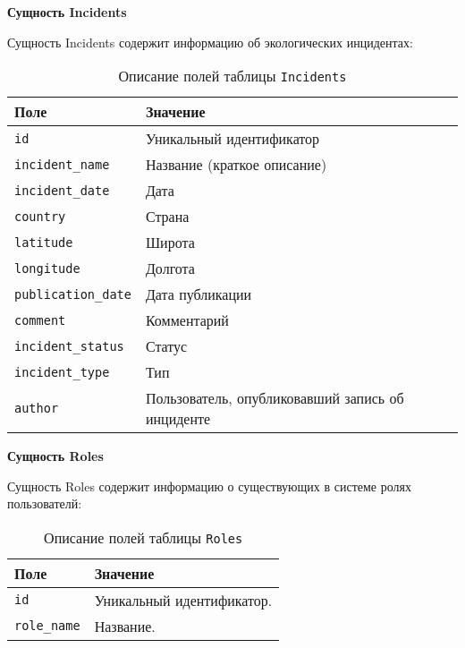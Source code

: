 \noindent\textbf{Сущность Incidents}

Сущность Incidents содержит информацию об экологических инцидентах:
\begin{table}[!ht]
    \caption{Описание полей таблицы \texttt{Incidents}}
    \label{tbl:incidents}
    \begin{center}
        \begin{tabular}{|p{}p{}|}
            \hline
            \textbf{Поле} & \textbf{Значение} \\\hline
            \texttt{id} & Уникальный идентификатор \\\hline
            \texttt{incident\_name} & Название (краткое описание) \\\hline
            \texttt{incident\_date} & Дата\\\hline
            \texttt{country} & Страна \\\hline
            \texttt{latitude} & Широта \\\hline
            \texttt{longitude} & Долгота \\\hline
            \texttt{publication\_date} & Дата публикации \\\hline
            \texttt{comment} & Комментарий\\\hline
            \texttt{incident\_status} & Статус \\\hline
            \texttt{incident\_type} & Тип \\\hline
            \texttt{author} & Пользователь, опубликовавший запись об инциденте \\\hline
        \end{tabular}
    \end{center}
\end{table}

\newpage

\noindent\textbf{Сущность Roles}

Сущность Roles содержит информацию о существующих в системе ролях пользователй:
\begin{table}[!ht]
	\caption{Описание полей таблицы \texttt{Roles}}
	\label{tbl:roles}
	\begin{center}
		\begin{tabular}{|p{}p{}|}
			\hline
			\textbf{Поле} & \textbf{Значение} \\\hline
			\texttt{id} & Уникальный идентификатор. \\\hline
			\texttt{role\_name} & Название. \\\hline
		\end{tabular}
	\end{center}
\end{table}

